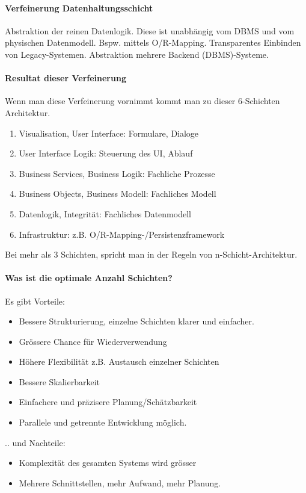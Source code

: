 \paragraph{Verfeinerung Datenhaltungsschicht} Abstraktion der reinen Datenlogik. Diese ist unabhängig vom DBMS und vom physischen Datenmodell. Bspw. mittels O/R-Mapping. Transparentes Einbinden von Legacy-Systemen. Abstraktion mehrere Backend (DBMS)-Systeme.

\paragraph{Resultat dieser Verfeinerung}
Wenn man diese Verfeinerung vornimmt kommt man zu dieser 6-Schichten Architektur.
\begin{enumerate}
	\item Visualisation, User Interface: Formulare, Dialoge 
	\item User Interface Logik: Steuerung des UI, Ablauf
	\item Business Services, Business Logik: Fachliche Prozesse
	\item Business Objects, Business Modell: Fachliches Modell
	\item Datenlogik, Integrität: Fachliches Datenmodell
	\item Infrastruktur: z.B. O/R-Mapping-/Persistenzframework
\end{enumerate}
Bei mehr als 3 Schichten, spricht man in der Regeln von n-Schicht-Architektur.

\paragraph{Was ist die optimale Anzahl Schichten?}
Es gibt Vorteile:
\begin{itemize}
	\item Bessere Strukturierung, einzelne Schichten klarer und einfacher.
	\item Grössere Chance für Wiederverwendung
	\item Höhere Flexibilität z.B. Austausch einzelner Schichten
	\item Bessere Skalierbarkeit
	\item Einfachere und präzisere Planung/Schätzbarkeit
	\item Parallele und getrennte Entwicklung möglich.
\end{itemize}

.. und Nachteile:
\begin{itemize}
	\item Komplexität des gesamten Systems wird grösser
	\item Mehrere Schnittstellen, mehr Aufwand, mehr Planung.
\end{itemize}

